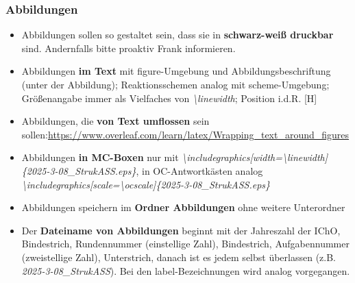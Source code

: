 \documentclass[./main.tex]{subfiles}
\begin{document}
\subsubsection{Abbildungen}
\begin{itemize}
    \item Abbildungen sollen so gestaltet sein, dass sie in \textbf{schwarz-wei\ss{} druckbar} sind. Andernfalls bitte proaktiv Frank informieren. 
    \item Abbildungen \textbf{im Text} mit figure-Umgebung und Abbildungsbeschriftung (unter der Abbildung); Reaktionsschemen analog mit scheme-Umgebung; Gr\"o\ss{}enangabe immer als Vielfaches von \textit{\hypertarget{linewidth}{\textbackslash linewidth}}; Position i.d.R. [H]
    \item Abbildungen, die \textbf{von Text umflossen} sein sollen:\newline \url{https://www.overleaf.com/learn/latex/Wrapping_text_around_figures}
    \item Abbildungen \textbf{in MC-Boxen} nur mit \textit{\hypertarget{includegraphics}{\textbackslash includegraphics[width=\textbackslash linewidth]\{2025-3-08\_StrukASS.eps\}}}, in OC-Antwortk\"asten analog \hypertarget{ocscale}{\textit{\textbackslash includegraphics[scale=\textbackslash ocscale]\{2025-3-08\_StrukASS.eps\}}}
    \item Abbildungen speichern im \textbf{Ordner Abbildungen} ohne weitere Unterordner
    \item Der \textbf{Dateiname von Abbildungen} beginnt mit der Jahreszahl der IChO, Bindestrich, Rundennummer (einstellige Zahl), Bindestrich, Aufgabennummer (zweistellige Zahl), Unterstrich, danach ist es jedem selbst \"uberlassen (z.B. \textit{2025-3-08\_StrukASS}). Bei den label-Bezeichnungen wird analog vorgegangen. 
\end{itemize}
\end{document}
